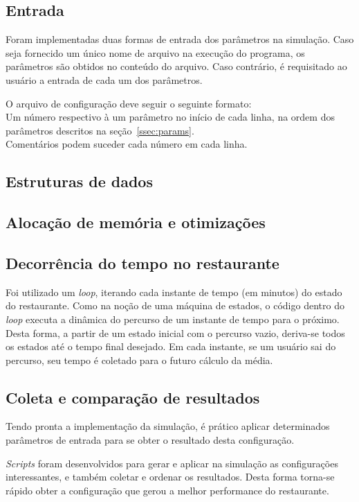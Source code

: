 \documentclass{article}
\begin{document}
\subsection{Entrada}
Foram implementadas duas formas de entrada dos parâmetros na simulação. Caso seja fornecido um único nome de arquivo na execução do programa, os parâmetros são obtidos no conteúdo do arquivo. Caso contrário, é requisitado ao usuário a entrada de cada um dos parâmetros.

O arquivo de configuração deve seguir o seguinte formato:\\
Um número respectivo à um parâmetro no início de cada linha, na ordem dos parâmetros descritos na seção~\ref{ssec:params}.\\
Comentários podem suceder cada número em cada linha.

\subsection{Estruturas de dados}

\subsection{Alocação de memória e otimizações}

\subsection{Decorrência do tempo no restaurante}
Foi utilizado um \textit{loop}, iterando cada instante de tempo (em minutos) do estado do restaurante. Como na noção de uma máquina de estados, o código dentro do \textit{loop} executa a dinâmica do percurso de um instante de tempo para o próximo. Desta forma, a partir de um estado inicial com o percurso vazio, deriva-se todos os estados até o tempo final desejado. Em cada instante, se um usuário sai do percurso, seu tempo é coletado para o futuro cálculo da média.

\subsection{Coleta e comparação de resultados}
Tendo pronta a implementação da simulação, é prático aplicar determinados parâmetros de entrada para se obter o resultado desta configuração.

\textit{Scripts} foram desenvolvidos para gerar e aplicar na simulação as configurações interessantes, e também coletar e ordenar os resultados. Desta forma torna-se rápido obter a configuração que gerou a melhor performance do restaurante.
\end{document}

